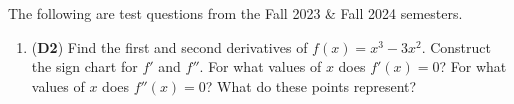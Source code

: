 \documentclass[10pt]{article}
\begin{document}
\pagestyle{otherpages}
\thispagestyle{firstpage}

The following are test questions from the Fall 2023 \& Fall 2024 semesters.

\begin{enumerate}

\item ({\bf\color{ForestGreen}D2}) Find the first and second derivatives of $f(x) = x^3 - 3x^2$. Construct the sign chart for $f'$ and $f''$. For what values of $x$ does $f'(x) = 0$? For what values of $x$ does $f''(x) = 0$? What do these points represent?

    \vfill



\end{enumerate}


\end{document}
